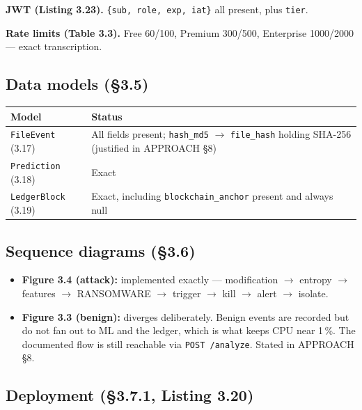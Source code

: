 \documentclass[11pt,a4paper]{article}
\begin{document}
\textbf{JWT (Listing 3.23).} \texttt{\{sub, role, exp, iat\}} all present, plus \texttt{tier}.

\textbf{Rate limits (Table 3.3).} Free 60/100, Premium 300/500, Enterprise 1000/2000 ---
exact transcription.

\subsection{Data models (\S3.5)}

\begin{center}
\begin{tabularx}{\linewidth}{@{}P{3.6cm}L@{}}
\toprule
\textbf{Model} & \textbf{Status} \\
\midrule
\texttt{FileEvent} (3.17)   & All fields present; \texttt{hash\_md5} $\rightarrow$ \texttt{file\_hash} holding SHA-256 (justified in APPROACH \S8) \\
\texttt{Prediction} (3.18)  & Exact \\
\texttt{LedgerBlock} (3.19) & Exact, including \texttt{blockchain\_anchor} present and always null \\
\bottomrule
\end{tabularx}
\end{center}

\subsection{Sequence diagrams (\S3.6)}

\begin{itemize}[leftmargin=*,itemsep=0.4em]
  \item \textbf{Figure 3.4 (attack):} implemented exactly --- modification $\rightarrow$
        entropy $\rightarrow$ features $\rightarrow$ RANSOMWARE $\rightarrow$ trigger
        $\rightarrow$ kill $\rightarrow$ alert $\rightarrow$ isolate.
  \item \textbf{Figure 3.3 (benign):} diverges deliberately. Benign events are recorded but
        do not fan out to ML and the ledger, which is what keeps CPU near 1\,\%. The
        documented flow is still reachable via \texttt{POST /analyze}. Stated in
        APPROACH \S8.
\end{itemize}

\subsection{Deployment (\S3.7.1, Listing 3.20)}
\end{document}
